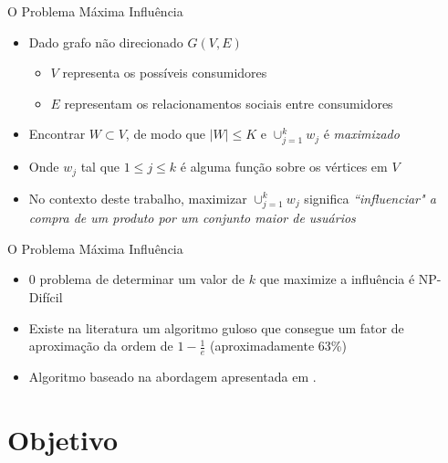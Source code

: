 \documentclass[t,14pt,mathserif,xcolor=table]{beamer}
\begin{document}
\begin{frame}{O Problema Máxima Influência}

	\begin{itemize}
		\item Dado grafo não direcionado $G(V,E)${}
			\begin{itemize}
				\item $V$ representa os possíveis consumidores
				\item $E$ representam os relacionamentos sociais entre consumidores		
			\end{itemize}
			
		\item Encontrar $W \subset V${}, de modo que $\left\vert W \right\vert\leq K$ e $\cup_{j=1}^{k} w_{j}$ é \textit{maximizado}
		\item Onde $w_j$ tal que $ 1 \leq j \leq k$ é alguma função sobre os vértices em $V$
		\item No contexto deste trabalho, maximizar $\cup_{j=1}^{k} w_{j}$ significa \textit{``influenciar" a compra de um produto por um conjunto maior de usuários}{}
	
		
	\end{itemize}
	
\end{frame}

\begin{frame}{O Problema Máxima Influência}

	\begin{itemize}
		\item  0 problema de determinar um valor de $k$ que maximize a influência é NP-Difícil \cite{Garey:1979:CIG:578533}{}
	   \item Existe na literatura um algoritmo guloso que consegue um fator de aproximação da ordem de $1-\frac{1}{e}$ (aproximadamente 63\%) \cite{Hochbaum:1996:ACP:241938.241941}
	  \item  Algoritmo baseado na abordagem apresentada em \cite{domingos2001mining}.
		
	\end{itemize}
	
\end{frame}

\section{Objetivo}
\end{document}
